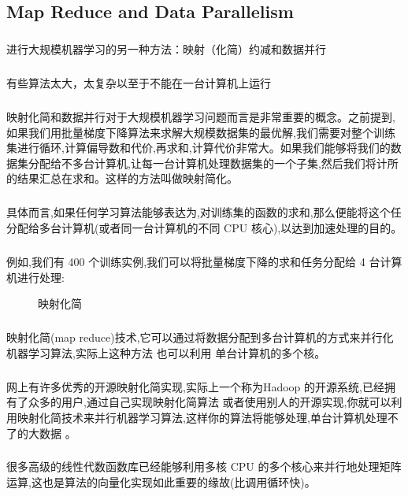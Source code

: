 \documentclass{article}
\begin{document}
\begin{CJK}{UTF8}{gbsn}
\subsection{Map Reduce and Data Parallelism}
\subparagraph{}
进行大规模机器学习的另一种方法：映射（化简）约减和数据并行
\subparagraph{}
有些算法太大，太复杂以至于不能在一台计算机上运行
\subparagraph{}
映射化简和数据并行对于大规模机器学习问题而言是非常重要的概念。之前提到,如果我们用批量梯度下降算法来求解大规模数据集的最优解,我们需要对整个训练集进行循环,计算偏导数和代价,再求和,计算代价非常大。如果我们能够将我们的数据集分配给不多台计算机,让每一台计算机处理数据集的一个子集,然后我们将计所的结果汇总在求和。这样的方法叫做映射简化。
\subparagraph{}
具体而言,如果任何学习算法能够表达为,对训练集的函数的求和,那么便能将这个任分配给多台计算机(或者同一台计算机的不同 CPU 核心),以达到加速处理的目的。
\subparagraph{}
例如,我们有 400 个训练实例,我们可以将批量梯度下降的求和任务分配给 4 台计算机进行处理:
\begin{figure}[H]
\label{fig:11130}
\end{figure}
\begin{figure}[H]
\label{fig:11131}
\caption{映射化简}
\end{figure}
\begin{figure}[H]
\label{fig:11135 }
\end{figure}
\begin{figure}[H]
\label{fig:11136}
\end{figure}
\subparagraph{}
映射化简(map reduce)技术,它可以通过将数据分配到多台计算机的方式来并行化机器学习算法,实际上这种方法 也可以利用 单台计算机的多个核。
\subparagraph{}
网上有许多优秀的开源映射化简实现,实际上一个称为Hadoop 的开源系统,已经拥有了众多的用户,通过自己实现映射化简算法 或者使用别人的开源实现,你就可以利用映射化简技术来并行机器学习算法,这样你的算法将能够处理,单台计算机处理不了的大数据 。
\subparagraph{}
很多高级的线性代数函数库已经能够利用多核 CPU 的多个核心来并行地处理矩阵运算,这也是算法的向量化实现如此重要的缘故(比调用循环快)。
\begin{figure}[H]
\label{fig:11137}
\end{figure}
\begin{figure}[H]
\label{fig:11138}
\end{figure}

\end{CJK}
\end{document}
